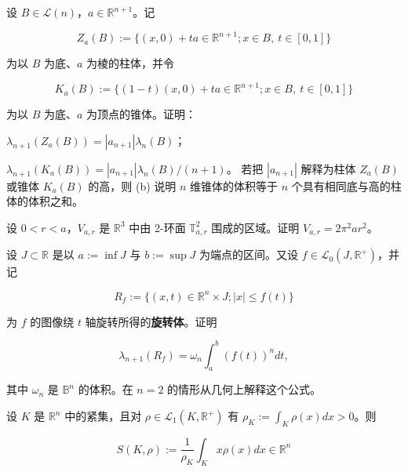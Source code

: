 \begin{exercises}
\item

设 $ B \in \mathcal{L}(n) $，$ a \in \mathbb{R}^{n+1} $。记

\[
Z_a(B) := \{ (x,0) + ta \in \mathbb{R}^{n+1} ; x \in B,\ t \in [0,1] \}
\]

为以 $ B $ 为底、$ a $ 为棱的柱体，并令

\[
K_a(B) := \{ (1-t)(x,0) + ta \in \mathbb{R}^{n+1} ; x \in B,\ t \in [0,1] \}
\]

为以 $ B $ 为底、$ a $ 为顶点的锥体。证明：

\begin{items}
\item

$ \lambda_{n+1}(Z_a(B)) = |a_{n+1}|\lambda_n(B) $；

\item

$ \lambda_{n+1}(K_a(B)) = |a_{n+1}|\lambda_n(B)/(n+1) $。
若把 $ |a_{n+1}| $ 解释为柱体 $ Z_a(B) $ 或锥体 $ K_a(B) $ 的高，则 (b) 说明 $ n $ 维锥体的体积等于 $ n $ 个具有相同底与高的柱体的体积之和。

\end{items}

\item

设 $ 0 < r < a $，$ V_{a,r} $ 是 $ \mathbb{R}^3 $ 中由 2-环面 $ \mathbb{T}^2_{a,r} $ 围成的区域。证明 $ V_{a,r} = 2\pi^2 ar^2 $。

\item

设 $ J \subset \mathbb{R} $ 是以 $ a := \inf J $ 与 $ b := \sup J $ 为端点的区间。又设 $ f \in \mathcal{L}_0(J, \mathbb{R}^+) $，并记

\[
R_f := \{ (x,t) \in \mathbb{R}^n \times J ; |x| \le f(t) \}
\]

为 $ f $ 的图像绕 $ t $ 轴旋转所得的\textbf{旋转体}。证明

\[
\lambda_{n+1}(R_f) = \omega_n \int_a^b (f(t))^n dt ,
\]

其中 $ \omega_n $ 是 $ \mathbb{B}^n $ 的体积。在 $ n = 2 $ 的情形从几何上解释这个公式。

\item

设 $ K $ 是 $ \mathbb{R}^n $ 中的紧集，且对 $ \rho \in \mathcal{L}_1(K, \mathbb{R}^+) $ 有 $ \rho_K := \int_K \rho(x) dx > 0 $。则

\[
S(K,\rho) := \frac{1}{\rho_K} \int_K x\rho(x) dx \in \mathbb{R}^n
\]


\end{exercises}
